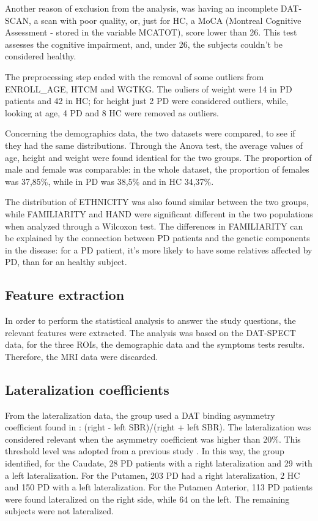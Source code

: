 \documentclass[]{article}
\begin{document}
\begin{multicols}{2}

Another reason of exclusion from the analysis, was having an incomplete DAT-SCAN, a scan with poor quality, or, just for HC, a MoCA (Montreal Cognitive Assessment - stored in the variable MCATOT), score lower than 26. This test assesses the cognitive impairment, and, under 26, the subjects couldn't be considered healthy. 

The preprocessing step ended with the removal of some outliers from ENROLL\_AGE, HTCM and WGTKG. The ouliers of weight were 14 in PD patients and 42 in HC; for height just 2 PD were considered outliers, while, looking at age, 4 PD and 8 HC were removed as outliers.

Concerning the demographics data, the two datasets were compared, to see if they had the same distributions. Through the Anova test, the average values of age, height and weight were found identical for the two groups. The proportion of male and female was comparable: in the whole dataset, the proportion of females was 37,85\%, while in PD was 38,5\% and in HC 34,37\%. 

The distribution of ETHNICITY was also found similar between the two groups, while FAMILIARITY and HAND were significant different in the two populations when analyzed through a Wilcoxon test. The differences in FAMILIARITY can be explained by the connection between PD patients and the genetic components in the disease: for a PD patient, it's more likely to have some relatives affected by PD, than for an healthy subject. 


\subsection{Feature extraction}

In order to perform the statistical analysis to answer the study questions, the relevant features were extracted.
The analysis was based on the DAT-SPECT data, for the three ROIs, the demographic data and the symptoms tests results. Therefore, the MRI data were discarded.

\subsection{Lateralization coefficients}

From the lateralization data, the group used a DAT binding asymmetry coefficient found in \cite{kaasinen_ipsilateral_2016}: (right - left SBR)/(right + left SBR). The lateralization was considered relevant when the asymmetry coefficient was higher than 20\%.
This threshold level was adopted from a previous study \cite{fiorenzato_asymmetric_2021}. In this way, the group identified, for the Caudate, 28 PD patients with a right lateralization and 29 with a left lateralization. For the Putamen, 203 PD had a right lateralization, 2 HC and 150 PD with a left lateralization. For the Putamen Anterior, 113 PD patients were found lateralized on the right side, while 64 on the left. The remaining subjects were not lateralized.


\end{multicols}
\end{document}
